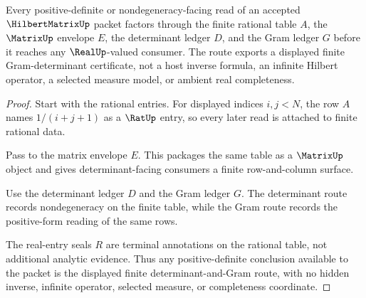 \begin{theorem}
\label{thm:hilbert-matrix-positive-definite-route}
Every positive-definite or nondegeneracy-facing read of an accepted $\HilbertMatrixUp$ packet factors through the finite rational table $A$, the $\MatrixUp$ envelope $E$, the determinant ledger $D$, and the Gram ledger $G$ before it reaches any $\RealUp$-valued consumer. The route exports a displayed finite Gram-determinant certificate, not a host inverse formula, an infinite Hilbert operator, a selected measure model, or ambient real completeness.
\end{theorem}
\begin{proof}
Start with the rational entries. For displayed indices $i,j<N$, the row $A$ names $1/(i+j+1)$ as a $\RatUp$ entry, so every later read is attached to finite rational data.

Pass to the matrix envelope $E$. This packages the same table as a $\MatrixUp$ object and gives determinant-facing consumers a finite row-and-column surface.

Use the determinant ledger $D$ and the Gram ledger $G$. The determinant route records nondegeneracy on the finite table, while the Gram route records the positive-form reading of the same rows.

The real-entry seals $R$ are terminal annotations on the rational table, not additional analytic evidence. Thus any positive-definite conclusion available to the packet is the displayed finite determinant-and-Gram route, with no hidden inverse, infinite operator, selected measure, or completeness coordinate.
\end{proof}



